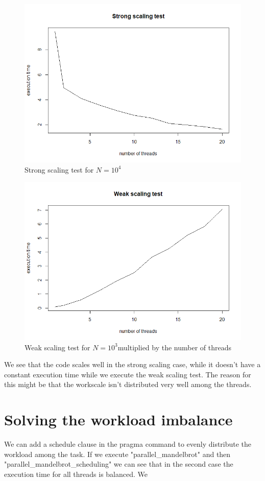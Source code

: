 \documentclass{article}
\begin{document}
\begin{figure}[H] %
	\centering
	\includegraphics[width=0.8\columnwidth]{graphs/strong_scaling_test_mandelbrot} %
	\caption{Strong scaling test for $N=10^4$ }
\end{figure}
\begin{figure}[H] %
	\centering
	\includegraphics[width=0.8\columnwidth]{graphs/weak_scaling_test_mandelbrot} %
	\caption{Weak scaling test for $N=10^3$multiplied by the number of threads}
\end{figure}
We see that the code scales well in the strong scaling case, while it doesn't have a constant execution time while we execute the weak scaling test. The reason for this might be that the workscale isn't distributed very well among the threads. 

\section{Solving the workload imbalance}
We can add a schedule clause in the pragma command to evenly distribute the workload among the task. If we execute "parallel\_mandelbrot" and then "parallel_mandelbrot_scheduling" we can see that in the second case the execution time for all threads is balanced.
We 
\end{document}
